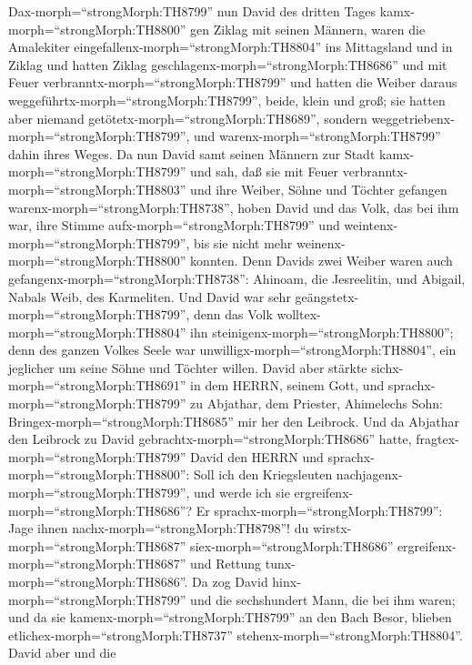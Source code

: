  Dax-morph=``strongMorph:TH8799'' nun David des dritten
Tages kamx-morph=``strongMorph:TH8800'' gen Ziklag mit seinen Männern,
waren die Amalekiter eingefallenx-morph=``strongMorph:TH8804'' ins
Mittagsland und in Ziklag und hatten Ziklag
geschlagenx-morph=``strongMorph:TH8686'' und mit Feuer
verbranntx-morph=``strongMorph:TH8799''  und hatten die
Weiber daraus weggeführtx-morph=``strongMorph:TH8799'', beide, klein und
groß; sie hatten aber niemand getötetx-morph=``strongMorph:TH8689'',
sondern weggetriebenx-morph=``strongMorph:TH8799'', und
warenx-morph=``strongMorph:TH8799'' dahin ihres Weges.  Da
nun David samt seinen Männern zur Stadt
kamx-morph=``strongMorph:TH8799'' und sah, daß sie mit Feuer
verbranntx-morph=``strongMorph:TH8803'' und ihre Weiber, Söhne und
Töchter gefangen warenx-morph=``strongMorph:TH8738'',  hoben
David und das Volk, das bei ihm war, ihre Stimme
aufx-morph=``strongMorph:TH8799'' und
weintenx-morph=``strongMorph:TH8799'', bis sie nicht mehr
weinenx-morph=``strongMorph:TH8800'' konnten.  Denn Davids
zwei Weiber waren auch gefangenx-morph=``strongMorph:TH8738'': Ahinoam,
die Jesreelitin, und Abigail, Nabals Weib, des Karmeliten. 
Und David war sehr geängstetx-morph=``strongMorph:TH8799'', denn das
Volk wolltex-morph=``strongMorph:TH8804'' ihn
steinigenx-morph=``strongMorph:TH8800''; denn des ganzen Volkes Seele
war unwilligx-morph=``strongMorph:TH8804'', ein jeglicher um seine Söhne
und Töchter willen. David aber stärkte
sichx-morph=``strongMorph:TH8691'' in dem HERRN, seinem Gott,
 und sprachx-morph=``strongMorph:TH8799'' zu Abjathar, dem
Priester, Ahimelechs Sohn: Bringex-morph=``strongMorph:TH8685'' mir her
den Leibrock. Und da Abjathar den Leibrock zu David
gebrachtx-morph=``strongMorph:TH8686'' hatte, 
fragtex-morph=``strongMorph:TH8799'' David den HERRN und
sprachx-morph=``strongMorph:TH8800'': Soll ich den Kriegsleuten
nachjagenx-morph=``strongMorph:TH8799'', und werde ich sie
ergreifenx-morph=``strongMorph:TH8686''? Er
sprachx-morph=``strongMorph:TH8799'': Jage ihnen
nachx-morph=``strongMorph:TH8798''! du
wirstx-morph=``strongMorph:TH8687'' siex-morph=``strongMorph:TH8686''
ergreifenx-morph=``strongMorph:TH8687'' und Rettung
tunx-morph=``strongMorph:TH8686''.  Da zog David
hinx-morph=``strongMorph:TH8799'' und die sechshundert Mann, die bei ihm
waren; und da sie kamenx-morph=``strongMorph:TH8799'' an den Bach Besor,
blieben etlichex-morph=``strongMorph:TH8737''
stehenx-morph=``strongMorph:TH8804''.  David aber und die
